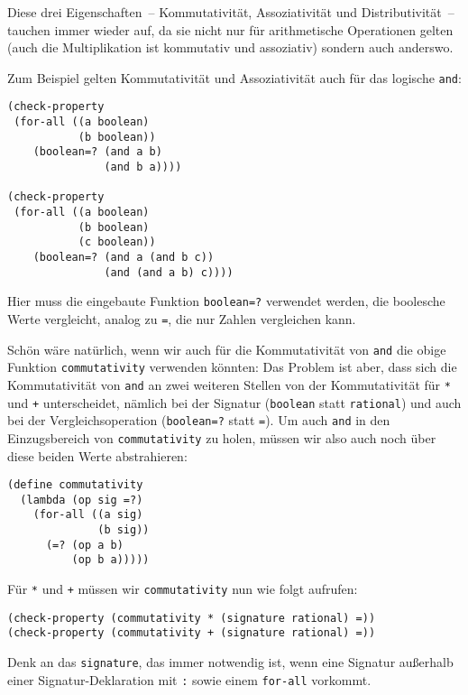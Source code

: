 Diese drei Eigenschaften~-- Kommutativität, Assoziativität und
Distributivität~-- tauchen immer wieder auf, da sie nicht nur für
arithmetische Operationen gelten (auch die Multiplikation ist
kommutativ und assoziativ) sondern auch anderswo.  

Zum Beispiel gelten
Kommutativität und Assoziativität auch für das logische \lstinline{and}:
%
\begin{lstlisting}
(check-property
 (for-all ((a boolean)
           (b boolean))
    (boolean=? (and a b)
               (and b a))))

(check-property
 (for-all ((a boolean)
           (b boolean)
           (c boolean))
    (boolean=? (and a (and b c))
               (and (and a b) c))))
\end{lstlisting}
%
Hier muss die eingebaute Funktion \lstinline{boolean=?} verwendet werden,
die boolesche Werte vergleicht, analog zu \lstinline{=}, die nur Zahlen
vergleichen kann.

Schön wäre natürlich, wenn wir auch für die Kommutativität von
\lstinline{and} die obige Funktion \lstinline{commutativity} verwenden
könnten: Das Problem ist aber, dass sich die Kommutativität von
\lstinline{and} an zwei weiteren Stellen von der Kommutativität für
\lstinline{*} und \lstinline{+} unterscheidet, nämlich bei der Signatur
(\lstinline{boolean} statt \lstinline{rational}) und auch bei der
Vergleichsoperation (\lstinline{boolean=?} statt \lstinline{=}).  Um auch
\lstinline{and} in den Einzugsbereich von \lstinline{commutativity} zu
holen, müssen wir also auch noch über diese beiden Werte abstrahieren:
%
\begin{lstlisting}
(define commutativity
  (lambda (op sig =?)
    (for-all ((a sig)
              (b sig))
      (=? (op a b)
          (op b a)))))
\end{lstlisting}
%
Für \lstinline{*} und \lstinline{+} müssen wir \lstinline{commutativity} nun
wie folgt aufrufen:
%
\begin{lstlisting}
(check-property (commutativity * (signature rational) =))
(check-property (commutativity + (signature rational) =))
\end{lstlisting}
%
Denk an das \lstinline{signature}, das immer notwendig ist, wenn
eine Signatur außerhalb einer Signatur-Deklaration mit \lstinline{:} sowie
einem \lstinline{for-all} vorkommt.

